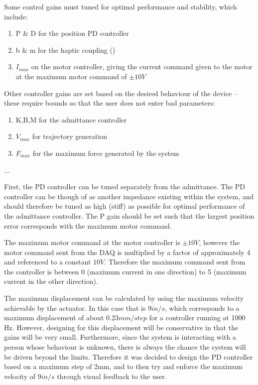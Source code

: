 \documentclass[12pt]{report}
\begin{document}
	Some control gains must tuned for optimal performance and stability, which include:
	
	\begin{enumerate}
		\item P \& D for the position PD controller 
		\item b \& m for the haptic coupling ()
		\item $I_{max}$ on the motor controller, giving the current command given to the motor at the maximum motor command of $\pm 10V$
	\end{enumerate}		
	
	Other controller gains are set based on the desired behaviour of the device -- these require bounds so that the user does not enter bad parameters:
	
	\begin{enumerate}
		\item K,B,M for the admittance controller
		\item $V_{max}$ for trajectory generation
		\item $F_{max}$ for the maximum force generated by the system
	\end{enumerate}
	
	...
	
	First, the PD controller can be tuned separately from the admittance. The PD controller can be though of as another impedance existing within the system, and should therefore be tuned as high (stiff) as possible for optimal performance of the admittance controller. The P gain should be set such that the largest position error corresponds with the maximum motor command.
	
	The maximum motor command at the motor controller is $\pm 10V$, however the motor command sent from the DAQ is multiplied by a factor of approximately 4 and referenced to a constant $10 V$. Therefore the maximum command sent from the controller is between 0 (maximum current in one direction) to 5 (maximum current in the other direction). 
	
	The maximum displacement can be calculated by using the maximum velocity achievable by the actuator. In this case that is $9 in/s$, which corresponds to a maximum displacement of about $0.23 mm/step$ for a controller running at 1000 Hz. However, designing for this displacement will be conservative in that the gains will be very small. Furthermore, since the system is interacting with a person whose behaviour is unknown, there is always the chance the system will be driven beyond the limits. Therefore it was decided to design the PD controller based on a maximum step of 2mm, and to then try and enforce the maximum velocity of $9 in/s$ through visual feedback to the user.
	
\end{document}
